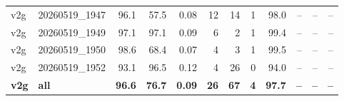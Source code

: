 \begin{table}[t]
\begin{tabular}{llrrrrrrrrrr}
v2g & 20260519\_1947 & 96.1 & 57.5 & 0.08 & 12 & 14 & 1 & 98.0 & -- & -- & -- \\
v2g & 20260519\_1949 & 97.1 & 97.1 & 0.09 & 6 & 2 & 1 & 99.4 & -- & -- & -- \\
v2g & 20260519\_1950 & 98.6 & 68.4 & 0.07 & 4 & 3 & 1 & 99.5 & -- & -- & -- \\
v2g & 20260519\_1952 & 93.1 & 96.5 & 0.12 & 4 & 26 & 0 & 94.0 & -- & -- & -- \\
\textbf{v2g} & \textbf{all} & \textbf{96.6} & \textbf{76.7} & \textbf{0.09} & \textbf{26} & \textbf{67} & \textbf{4} & \textbf{97.7} & \textbf{--} & \textbf{--} & \textbf{--} \\
\bottomrule
\end{tabular}
\end{table}
